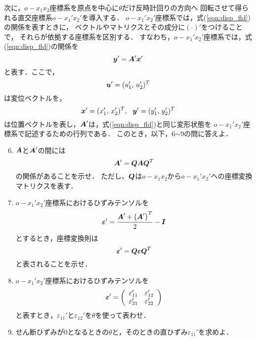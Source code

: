 \documentclass[10pt,a4j]{jarticle}
\begin{document}
次に，$o-x_1x_2$座標系を原点を中心に$\theta$だけ反時計回りの方向へ
回転させて得られる直交座標系$o-x_1'x_2'$を導入する．
$o-x_1'x_2'$座標系では，式(\ref{eqn:disp_fld})の関係を表すときに，
ベクトルやマトリクスとその成分に$(\cdot)'$をつけることで，
それらが依拠する座標系を区別する．
すなわち，$o-x_1'x_2'$座標系では，式(\ref{eqn:disp_fld})の関係を
\begin{equation}
	\mbox{\boldmath $y$}'=\mbox{\boldmath $A$}'\mbox{\boldmath $x$}'
	\label{eqn:disp_fld2}
\end{equation}
と表す．ここで，
\begin{equation}
	\mbox{\boldmath $u$}'=(u_1',\, u_2')^T
\end{equation}
は変位ベクトルを，
\begin{equation}
	\mbox{\boldmath $x$}'=(x_1',\, x_2')^T, \ \ \mbox{\boldmath $y$}'=(y_1',\, y_2')^T
\end{equation}
は位置ベクトルを表し，$\mbox{\boldmath $A$}'$は，式(\ref{eqn:disp_fld})と同じ変形状態を
$o-x_1'x_2'$座標系で記述するための行列である．
このとき，以下，6$\sim$9の問に答えよ．
\begin{enumerate}
\setcounter{enumi}{5}
\item
	$\mbox{\boldmath $A$}$と$\mbox{\boldmath $A$}'$の間には
	\[
		\mbox{\boldmath $A$}'=\mbox{\boldmath $Q$}\mbox{\boldmath $A$}\mbox{\boldmath $Q$}^T
	\]
	の関係があることを示せ．
	ただし、$\mbox{\boldmath $Q$}$は$o-x_1x_2$から$o-x_1'x_2'$への座標変換マトリクスを表す．
\item
	$o-x_1'x_2'$座標系におけるひずみテンソルを
	\[
		\mbox{\boldmath $\varepsilon$}'=\frac{\mbox{\boldmath $A$}'+\left(\mbox{\boldmath $A$}'\right)^T}{2}-\mbox{\boldmath $I$}
	\]
	とするとき，座標変換則は
	\[
		\mbox{\boldmath $\varepsilon$}'=\mbox{\boldmath $Q$}\mbox{\boldmath $\varepsilon$}\mbox{\boldmath $Q$}^T
	\]
	と表されることを示せ．
\item
	$o-x_1'x_2'$座標系におけるひずみテンソルを
	\[
	\mbox{\boldmath $\varepsilon$}'
	=
	\left(
	\begin{array}{cc}
		\varepsilon_{11}' & \varepsilon_{12}' \\
		\varepsilon_{21}' & \varepsilon_{22}'
	\end{array}
	\right)
	\]
	と表すとき，$\varepsilon_{11}'$と$\varepsilon_{12}'$を$\theta$を使って表わせ．
\item
	せん断ひずみが0となるときの$\theta$と，そのときの直ひずみ$\varepsilon_{11}'$を求めよ．
\end{enumerate}
\end{document}

